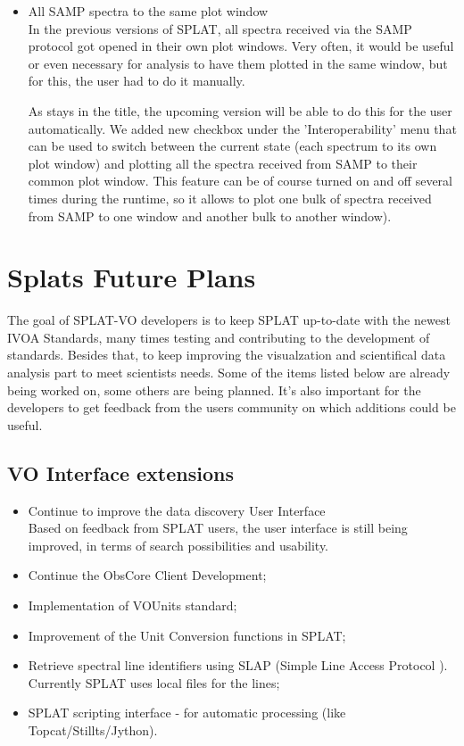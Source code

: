 \documentclass[final,authoryear,5p,times,twocolumn]{elsarticle}
\begin{document}
\begin{itemize}
\item All SAMP spectra to the same plot window\\

  In the previous versions of SPLAT, all spectra received via the SAMP
  protocol got opened in their own plot windows. Very often, it would
  be useful or even necessary for analysis to have them plotted in the
  same window, but for this, the user had to do it manually.

  As stays in the title, the upcoming version will be able to do this
  for the user automatically. We added new checkbox under the
  'Interoperability' menu that can be used to switch between the
  current state (each spectrum to its own plot window) and plotting
  all the spectra received from SAMP to their common plot window. This
  feature can be of course turned on and off several times during the
  runtime, so it allows to plot one bulk of spectra received from SAMP
  to one window and another bulk to another window).

\end{itemize}

\section{Splats Future Plans}

The goal of SPLAT-VO developers is to keep SPLAT up-to-date with the
newest IVOA Standards, many times testing and contributing to the
development of standards. Besides that, to keep improving the
visualzation and scientifical data analysis part to meet scientists
needs.  Some of the items listed below are already being worked on,
some others are being planned. It's also important for the developers
to get feedback from the users community on which additions could be
useful.

\subsection{VO Interface extensions}
\begin{itemize}
\item Continue to improve the data discovery User Interface\\
Based on feedback from SPLAT users, the user interface is still being improved, in terms of search possibilities and usability. 
\item Continue the ObsCore Client Development;
\item Implementation of  VOUnits \cite{vounits} standard;
\item	Improvement of the Unit Conversion functions in SPLAT;\\
\item Retrieve spectral line identifiers using SLAP (Simple Line Access Protocol \cite{slap}). Currently SPLAT uses local files for the lines;
\item  SPLAT scripting interface - for automatic processing (like Topcat/Stillts/Jython).
\end{itemize}
\end{document}
